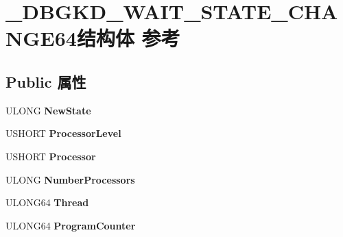 \hypertarget{struct___d_b_g_k_d___w_a_i_t___s_t_a_t_e___c_h_a_n_g_e64}{}\section{\+\_\+\+D\+B\+G\+K\+D\+\_\+\+W\+A\+I\+T\+\_\+\+S\+T\+A\+T\+E\+\_\+\+C\+H\+A\+N\+G\+E64结构体 参考}
\label{struct___d_b_g_k_d___w_a_i_t___s_t_a_t_e___c_h_a_n_g_e64}
\subsection*{Public 属性}
\begin{DoxyCompactItemize}
\item 
\mbox{\label{struct___d_b_g_k_d___w_a_i_t___s_t_a_t_e___c_h_a_n_g_e64_abd896eb93fc9e05c15f34ef428785b61}} 
U\+L\+O\+NG {\bfseries New\+State}
\item 
\mbox{\label{struct___d_b_g_k_d___w_a_i_t___s_t_a_t_e___c_h_a_n_g_e64_a7204400f92a9fb7d1e4831936cd04fcd}} 
U\+S\+H\+O\+RT {\bfseries Processor\+Level}
\item 
\mbox{\label{struct___d_b_g_k_d___w_a_i_t___s_t_a_t_e___c_h_a_n_g_e64_a275485916d3b82e9f0a7eb591fc148ec}} 
U\+S\+H\+O\+RT {\bfseries Processor}
\item 
\mbox{\label{struct___d_b_g_k_d___w_a_i_t___s_t_a_t_e___c_h_a_n_g_e64_a33cf1a5fa3c1bacae9ba39e206a7c55d}} 
U\+L\+O\+NG {\bfseries Number\+Processors}
\item 
\mbox{\label{struct___d_b_g_k_d___w_a_i_t___s_t_a_t_e___c_h_a_n_g_e64_a2c82a38fb24441196d57990814d5d0a2}} 
U\+L\+O\+N\+G64 {\bfseries Thread}
\item 
\mbox{\label{struct___d_b_g_k_d___w_a_i_t___s_t_a_t_e___c_h_a_n_g_e64_ac576fb4c5fdbf6256031f58907944183}} 
U\+L\+O\+N\+G64 {\bfseries Program\+Counter}

\end{DoxyCompactItemize}
